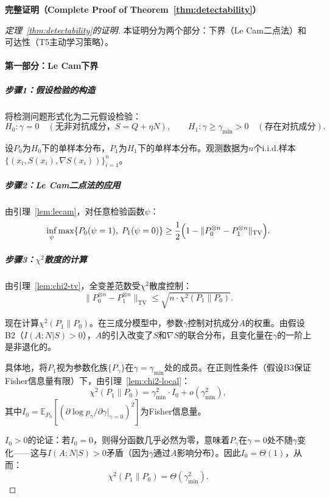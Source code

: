 \documentclass[12pt,a4paper]{article}
\newcommand{\E}{\mathbb{E}}
\newcommand{\TV}{\mathrm{TV}}
\begin{document}
\medskip\noindent
\textbf{完整证明（Complete Proof of Theorem~\ref{thm:detectability}）}

\begin{proof}[定理~\ref{thm:detectability}的证明]

本证明分为两个部分：下界（Le Cam二点法）和可达性（T5主动学习策略）。

\paragraph{第一部分：Le Cam下界}

\subparagraph{步骤1：假设检验的构造}
将检测问题形式化为二元假设检验：
\[
H_0: \gamma = 0 \quad (\text{无非对抗成分，} S = Q + \eta N), \qquad
H_1: \gamma \geq \gamma_{\min} > 0 \quad (\text{存在对抗成分}).
\]

设$P_0$为$H_0$下的单样本分布，$P_1$为$H_1$下的单样本分布。观测数据为$n$个i.i.d.样本$\{(x_i, S(x_i), \nabla S(x_i))\}_{i=1}^n$。

\subparagraph{步骤2：Le Cam二点法的应用}
由引理~\ref{lem:lecam}，对任意检验函数$\psi$：
\begin{equation}\label{eq:lecam-apply}
\inf_{\psi} \max\{ P_0(\psi=1),\; P_1(\psi=0) \}
   \geq \frac12 \Bigl(1 - \|P_0^{\otimes n} - P_1^{\otimes n}\|_{\TV} \Bigr).
\end{equation}

\subparagraph{步骤3：$\chi^2$散度的计算}
由引理~\ref{lem:chi2-tv}，全变差范数受$\chi^2$散度控制：
\[
\|P_0^{\otimes n} - P_1^{\otimes n}\|_{\TV} \leq \sqrt{n \cdot \chi^2(P_1 \| P_0)}.
\]

现在计算$\chi^2(P_1\|P_0)$。在三成分模型中，参数$\gamma$控制对抗成分$A$的权重。由假设B2（$I(A;N|S)>0$），$A$的引入改变了$S$和$\nabla S$的联合分布，且变化量在$\gamma$的一阶上是非退化的。

具体地，将$P_1$视为参数化族$\{P_\gamma\}$在$\gamma = \gamma_{\min}$处的成员。在正则性条件（假设B3保证Fisher信息量有限）下，由引理~\ref{lem:chi2-local}：
\begin{equation}\label{eq:chi2-gamma}
\chi^2(P_1 \| P_0) = \gamma_{\min}^2 \cdot I_0 + o(\gamma_{\min}^2),
\end{equation}
其中$I_0 = \E_{P_0}[(\partial \log p_\gamma/\partial \gamma|_{\gamma=0})^2]$为Fisher信息量。

$I_0 > 0$的论证：若$I_0 = 0$，则得分函数几乎必然为零，意味着$P_\gamma$在$\gamma=0$处不随$\gamma$变化——这与$I(A;N|S)>0$矛盾（因为$\gamma$通过$A$影响分布）。因此$I_0 = \Theta(1)$，从而：
\begin{equation}\label{eq:chi2-theta}
\chi^2(P_1 \| P_0) = \Theta(\gamma_{\min}^2).
\end{equation}


\end{proof}
\end{document}
